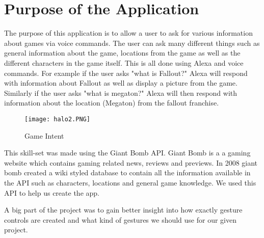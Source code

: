 \chapter{Purpose of the Application}
\setlength{\parskip}{1em}
The purpose of this application is to allow a user to ask for various information about games via voice commands. The user can ask many different things such as general information about the game, locations from the game as well as the different characters in the game itself. This is all done using Alexa and voice commands. For example if the user asks "what is Fallout?" Alexa will respond with information about Fallout as well as display a picture from the game. Similarly if the user asks "what is megaton?" Alexa will then respond with information about the location (Megaton) from the fallout franchise.

\begin{figure}[h!]
  \texttt{[image: halo2.PNG]}
  \caption{Game Intent}
  \label{fig:gameintent}
\end{figure}

This skill-set was made using the Giant Bomb API. Giant Bomb is a a gaming website which contains gaming related news, reviews and previews. In 2008 giant bomb created a wiki styled database to contain all the information available in the API such as characters, locations and general game knowledge. We used this API to help us create the app. 

A big part of the project was to gain better insight into how exactly gesture controls are created and what kind of gestures we should use for our given project. 
